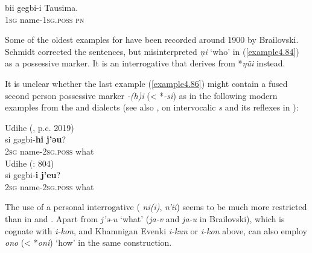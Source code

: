 \documentclass[output=paper,colorlinks,citecolor=brown]{langscibook}
\begin{document}
    \ex
    \gll bii		gegbi-i			Tausima.\\
    1\textsc{sg}		name-1\textsc{sg.poss}		\textsc{pn}\\
    \z
\z

Some of the oldest examples for  have been recorded around 1900 by Brailovski. Schmidt corrected the sentences, but misinterpreted \textit{ņi} ‘who’ in (\ref{example4.84}) as a possessive marker. It is an interrogative that derives from *\textit{ŋüi} instead.

\z

It is unclear whether the last example (\ref{example4.86}) might contain a fused second person possessive marker \textit{-(h)i} (< *\textit{-si}) as in the following modern examples from the  and  dialects (see also , on intervocalic \textit{s} and its reflexes in ):

\ea
    \label{example4.87}
     Udihe (, p.c. 2019)\\
    \gll si		gəgbi-\textbf{hi}			\textbf{j’əu}?\\
    2\textsc{sg}		name-2\textsc{sg.poss}		what\\
\ex
    \label{example4.88}
     Udihe (\citealt{NikolaevaTolskaya2001}: 804)\\
    \gll si		gegbi-\textbf{i}			\textbf{j’eu}?\\
    2\textsc{sg}		name-2\textsc{sg.poss}		what\\
\z

The use of a personal interrogative ( \textit{ni(i)},  \textit{n’ii}) seems to be much more restricted than in  and . Apart from \textit{j’ə-u} ‘what’ (\textit{ja-v} and \textit{ja-u} in Brailovski), which is cognate with  \textit{i-kon}, and Khamnigan Evenki \textit{i-kun} or \textit{i-kon} above,  can also employ \textit{ono} (< *\textit{oni}) ‘how’ in the same construction.
\end{document}
